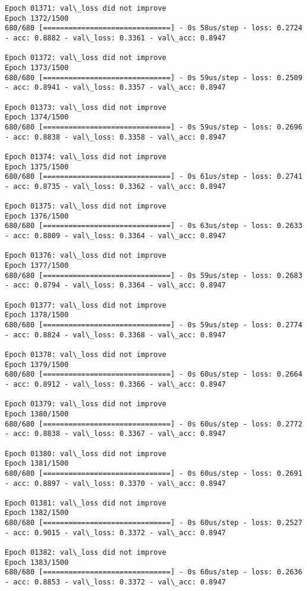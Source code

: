 \documentclass[11pt]{article}
\begin{document}
\begin{Verbatim}[commandchars=\\\{\}]
Epoch 01371: val\_loss did not improve
Epoch 1372/1500
680/680 [==============================] - 0s 58us/step - loss: 0.2724 - acc: 0.8882 - val\_loss: 0.3361 - val\_acc: 0.8947

Epoch 01372: val\_loss did not improve
Epoch 1373/1500
680/680 [==============================] - 0s 59us/step - loss: 0.2509 - acc: 0.8941 - val\_loss: 0.3357 - val\_acc: 0.8947

Epoch 01373: val\_loss did not improve
Epoch 1374/1500
680/680 [==============================] - 0s 59us/step - loss: 0.2696 - acc: 0.8838 - val\_loss: 0.3358 - val\_acc: 0.8947

Epoch 01374: val\_loss did not improve
Epoch 1375/1500
680/680 [==============================] - 0s 61us/step - loss: 0.2741 - acc: 0.8735 - val\_loss: 0.3362 - val\_acc: 0.8947

Epoch 01375: val\_loss did not improve
Epoch 1376/1500
680/680 [==============================] - 0s 63us/step - loss: 0.2633 - acc: 0.8809 - val\_loss: 0.3364 - val\_acc: 0.8947

Epoch 01376: val\_loss did not improve
Epoch 1377/1500
680/680 [==============================] - 0s 59us/step - loss: 0.2683 - acc: 0.8794 - val\_loss: 0.3364 - val\_acc: 0.8947

Epoch 01377: val\_loss did not improve
Epoch 1378/1500
680/680 [==============================] - 0s 59us/step - loss: 0.2774 - acc: 0.8824 - val\_loss: 0.3368 - val\_acc: 0.8947

Epoch 01378: val\_loss did not improve
Epoch 1379/1500
680/680 [==============================] - 0s 60us/step - loss: 0.2664 - acc: 0.8912 - val\_loss: 0.3366 - val\_acc: 0.8947

Epoch 01379: val\_loss did not improve
Epoch 1380/1500
680/680 [==============================] - 0s 60us/step - loss: 0.2772 - acc: 0.8838 - val\_loss: 0.3367 - val\_acc: 0.8947

Epoch 01380: val\_loss did not improve
Epoch 1381/1500
680/680 [==============================] - 0s 60us/step - loss: 0.2691 - acc: 0.8897 - val\_loss: 0.3370 - val\_acc: 0.8947

Epoch 01381: val\_loss did not improve
Epoch 1382/1500
680/680 [==============================] - 0s 60us/step - loss: 0.2527 - acc: 0.9015 - val\_loss: 0.3372 - val\_acc: 0.8947

Epoch 01382: val\_loss did not improve
Epoch 1383/1500
680/680 [==============================] - 0s 60us/step - loss: 0.2636 - acc: 0.8853 - val\_loss: 0.3372 - val\_acc: 0.8947


\end{Verbatim}
\end{document}
